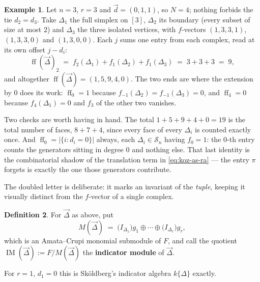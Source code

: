 \documentclass[11pt, a4paper, abstract=yes]{scrartcl}
\theoremstyle{definition}
\newtheorem{definition}{Definition}
\newtheorem{mexample}[definition]{Example}
\theoremstyle{remark}
\theoremstyle{plain}
\newcommand{\proj}{\pi}
\newcommand{\ff}{\operatorname{ff}}
\newcommand{\IM}{\operatorname{IM}}
\begin{document}
\begin{mexample}
Let \(n=3\), \(r=3\) and \(\vec d=(0,1,1)\), so \(N=4\); nothing forbids the tie \(d_2=d_3\). Take
\(\Delta_1\) the full simplex on \([3]\), \(\Delta_2\) its boundary (every subset of size at most
\(2\)) and \(\Delta_3\) the three isolated vertices, with \(f\)-vectors
\((1,3,3,1)\), \((1,3,3,0)\) and \((1,3,0,0)\). Each \(j\) sums one entry from each complex, read at
its own offset \(j-d_i\):
\begin{equation}\label{eq:ffvector-ex}
  \ff(\vec\Delta)_2\;=\;f_2(\Delta_1)+f_1(\Delta_2)+f_1(\Delta_3)\;=\;3+3+3\;=\;9,
\end{equation}
and altogether \(\ff(\vec\Delta)=(1,5,9,4,0)\). The two ends are where the extension by \(0\) does its
work: \(\ff_0=1\) because \(f_{-1}(\Delta_2)=f_{-1}(\Delta_3)=0\), and \(\ff_4=0\) because
\(f_4(\Delta_1)=0\) and \(f_3\) of the other two vanishes.

Two checks are worth having in hand. The total \(1+5+9+4+0=19\) is the total number of faces,
\(8+7+4\), since every face of every \(\Delta_i\) is counted exactly once. And
\(\ff_0=\lvert\lbrace i:d_i=0\rbrace\rvert\) always, each \(\Delta_i\in\mathcal S_n\) having
\(f_0=1\): the \(0\)-th entry counts the generators sitting in degree \(0\) and nothing else. That
last identity is the combinatorial shadow of the translation term in \eqref{eq:koz-as-ra} --- the
entry \(\proj\) forgets is exactly the one those generators contribute.
\label{ex-ffvector}
\end{mexample}

The doubled letter is deliberate: it marks an invariant of the \emph{tuple}, keeping it visually distinct
from the \(f\)-vector of a single complex.

\begin{definition}
For \(\vec\Delta\) as above, put
\begin{equation}\label{eq:indicator-module}
  M(\vec\Delta)\;=\;\bigl(I_{\Delta_1}\bigr)g_1\oplus\cdots\oplus\bigl(I_{\Delta_r}\bigr)g_r,
\end{equation}
which is an Amata--Crupi monomial submodule of \(F\), and call the quotient
\(\IM(\vec\Delta):=F/M(\vec\Delta)\) the \textbf{indicator module} of \(\vec\Delta\).
\label{def-indicator-module}
\end{definition}

For \(r=1\), \(d_1=0\) this is Sköldberg's indicator algebra \(k\lbrace\Delta\rbrace\) exactly.
\end{document}
